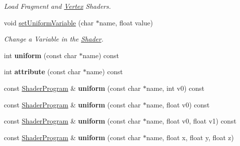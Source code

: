 \begin{DoxyCompactItemize}
\begin{DoxyCompactList}\small\item\em Load Fragment and \hyperlink{structvsr_1_1_vertex}{Vertex} Shaders. \end{DoxyCompactList}\item 
\hypertarget{classvsr_1_1_shader_program_a71d082741abc4f96f4b081462ae0cfaa}{void \hyperlink{classvsr_1_1_shader_program_a71d082741abc4f96f4b081462ae0cfaa}{set\-Uniform\-Variable} (char $\ast$name, float value)}\label{classvsr_1_1_shader_program_a71d082741abc4f96f4b081462ae0cfaa}

\begin{DoxyCompactList}\small\item\em Change a Variable in the \hyperlink{classvsr_1_1_shader}{Shader}. \end{DoxyCompactList}\item 
\hypertarget{classvsr_1_1_shader_program_a65d1ecc32aa3c9ed2530be9573302899}{int {\bfseries uniform} (const char $\ast$name) const }\label{classvsr_1_1_shader_program_a65d1ecc32aa3c9ed2530be9573302899}

\item 
\hypertarget{classvsr_1_1_shader_program_a26cdaf76289bab58c909579e68b29489}{int {\bfseries attribute} (const char $\ast$name) const }\label{classvsr_1_1_shader_program_a26cdaf76289bab58c909579e68b29489}

\item 
\hypertarget{classvsr_1_1_shader_program_a121a21a240b5e8328ff2b79cee52d8a0}{const \hyperlink{classvsr_1_1_shader_program}{Shader\-Program} \& {\bfseries uniform} (const char $\ast$name, int v0) const }\label{classvsr_1_1_shader_program_a121a21a240b5e8328ff2b79cee52d8a0}

\item 
\hypertarget{classvsr_1_1_shader_program_a0bd8666960490d82525479931046583e}{const \hyperlink{classvsr_1_1_shader_program}{Shader\-Program} \& {\bfseries uniform} (const char $\ast$name, float v0) const }\label{classvsr_1_1_shader_program_a0bd8666960490d82525479931046583e}

\item 
\hypertarget{classvsr_1_1_shader_program_afab77196ebd7f28b0225d71a10fbb21d}{const \hyperlink{classvsr_1_1_shader_program}{Shader\-Program} \& {\bfseries uniform} (const char $\ast$name, float v0, float v1) const }\label{classvsr_1_1_shader_program_afab77196ebd7f28b0225d71a10fbb21d}

\item 
\hypertarget{classvsr_1_1_shader_program_a32b3182d958f58873cf2d76df90138ae}{const \hyperlink{classvsr_1_1_shader_program}{Shader\-Program} \& {\bfseries uniform} (const char $\ast$name, float x, float y, float z)}\label{classvsr_1_1_shader_program_a32b3182d958f58873cf2d76df90138ae}


\end{DoxyCompactItemize}
